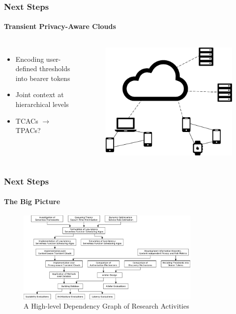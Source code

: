 \documentclass[aspectratio=169]{beamer}
\begin{document}
\begin{frame}
	\frametitle{Next Steps}
	\framesubtitle{Transient Privacy-Aware Clouds}

	\begin{columns}[c]
		\begin{itemize}
			\item Encoding user-defined thresholds into bearer tokens
			\item Joint context at hierarchical levels
			\item TCACs $\to$ TPACs?
		\end{itemize}
		\begin{figure}
			\centering
			\includegraphics[width=\columnwidth]{tcacs}
		\end{figure}
	\end{columns}
\end{frame}

\begin{frame}
	\frametitle{Next Steps}
	\framesubtitle{The Big Picture}

	\begin{figure}[h]
		\centering
		\includegraphics[width=0.8\textwidth]{dependencies}
		\caption{A High-level Dependency Graph of Research Activities}
	\end{figure}
\end{frame}
\end{document}
